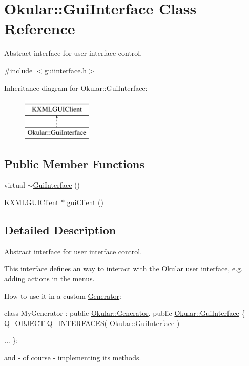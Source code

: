 \hypertarget{classOkular_1_1GuiInterface}{\section{Okular\+:\+:Gui\+Interface Class Reference}
\label{classOkular_1_1GuiInterface}
}


Abstract interface for user interface control.  




{\ttfamily \#include $<$guiinterface.\+h$>$}

Inheritance diagram for Okular\+:\+:Gui\+Interface\+:\begin{figure}[H]
\begin{center}
\leavevmode
\includegraphics[height=2.000000cm]{classOkular_1_1GuiInterface}
\end{center}
\end{figure}
\subsection*{Public Member Functions}
\begin{DoxyCompactItemize}
\item 
virtual \hyperlink{classOkular_1_1GuiInterface_a730cd577682b632165b28aef2a59bca0}{$\sim$\+Gui\+Interface} ()
\item 
K\+X\+M\+L\+G\+U\+I\+Client $\ast$ \hyperlink{classOkular_1_1GuiInterface_a723b44e54af18ea90a612ee9a51667cc}{gui\+Client} ()
\end{DoxyCompactItemize}


\subsection{Detailed Description}
Abstract interface for user interface control. 

This interface defines an way to interact with the \hyperlink{namespaceOkular}{Okular} user interface, e.\+g. adding actions in the menus.

How to use it in a custom \hyperlink{classOkular_1_1Generator}{Generator}\+: 
\begin{DoxyCode}
\textcolor{keyword}{class }MyGenerator : \textcolor{keyword}{public} \hyperlink{classOkular_1_1Generator}{Okular::Generator}, \textcolor{keyword}{public} 
      \hyperlink{classOkular_1_1GuiInterface}{Okular::GuiInterface}
\{
    Q\_OBJECT
    Q\_INTERFACES( \hyperlink{classOkular_1_1GuiInterface}{Okular::GuiInterface} )

    ...
\};
\end{DoxyCode}
 and -\/ of course -\/ implementing its methods. 

